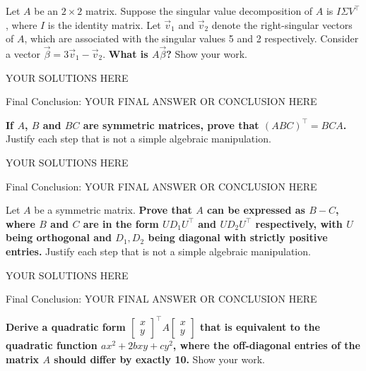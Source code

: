\qpart{[5 points]}

Let $A$ be an $2\times2$ matrix. Suppose the singular value decomposition of $A$ is $I \Sigma V^\top$, where $I$ is the identity matrix. Let $\vec{v}_1$ and $\vec{v}_2$ denote the right-singular vectors of $A$, which are associated with the singular values 5 and 2 respectively. Consider a vector $\vec{\beta} = 3\vec{v}_1 - \vec{v}_2$. \textbf{What is $A\vec{\beta}$?} Show your work. 

\begin{solution}

YOUR SOLUTIONS HERE

{\color{red} Final Conclusion: YOUR FINAL ANSWER OR CONCLUSION HERE}

\end{solution}

\qpart{[5 points]}
\textbf{If $A$, $B$ and $BC$ are symmetric matrices, prove that $(ABC)^\top = BCA$.} Justify each step that is not a simple algebraic manipulation. 

\begin{solution}

YOUR SOLUTIONS HERE

{\color{red} Final Conclusion: YOUR FINAL ANSWER OR CONCLUSION HERE}

\end{solution}

\qpart{[5 points]}

Let $A$ be a symmetric matrix. \textbf{Prove that $A$ can be expressed as $B-C$, where $B$ and $C$ are in the form $UD_1U^\top$ and $UD_2U^\top$ respectively, with $U$ being orthogonal and $D_1, D_2$ being diagonal with strictly positive entries.} Justify each step that is not a simple algebraic manipulation. 

\begin{solution}

YOUR SOLUTIONS HERE

{\color{red} Final Conclusion: YOUR FINAL ANSWER OR CONCLUSION HERE}

\end{solution}

\qpart{[5 points]}

\textbf{Derive a quadratic form $\begin{bmatrix} x \\ y \end{bmatrix}^\top A 
\begin{bmatrix} x \\ y \end{bmatrix}$ that is equivalent to the quadratic function $ax^2+2bxy+cy^2$, where the off-diagonal entries of the matrix $A$ should differ by exactly 10.} Show your work. 

